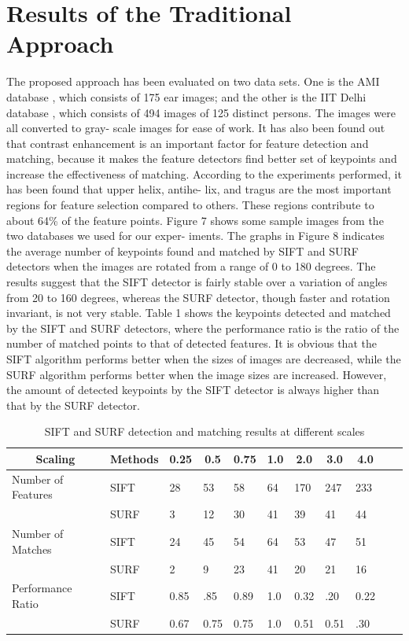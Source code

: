 \section{Results of the Traditional Approach}
The proposed approach has been evaluated on two data sets. One is the AMI database \cite{AMI}, which consists of 175 ear images; and the other is the IIT Delhi database \cite{IIT}, which consists of 494 images of 125 distinct persons. The images were all converted to gray- scale images for ease of work. It has also been found out that contrast enhancement is an important factor for feature detection and matching, because it makes the feature detectors find better set of keypoints and increase the effectiveness of matching.
According to the experiments performed, it has been found that upper helix, antihe- lix, and tragus are the most important regions for feature selection compared to others. These regions contribute to about 64{\%} of the feature points.
Figure 7 shows some sample images from the two databases we used for our exper- iments. The graphs in Figure 8 indicates the average number of keypoints found and matched by SIFT and SURF detectors when the images are rotated from a range of 0 to 180 degrees. The results suggest that the SIFT detector is fairly stable over a variation of angles from 20 to 160 degrees, whereas the SURF detector, though faster and rotation invariant, is not very stable.
Table 1 shows the keypoints detected and matched by the SIFT and SURF detectors, where the performance ratio is the ratio of the number of matched points to that of detected features. It is obvious that the SIFT algorithm performs better when the sizes of images are decreased, while the SURF algorithm performs better when the image sizes are increased. However, the amount of detected keypoints by the SIFT detector is always higher than that by the SURF detector.

\begin{table}[]
\centering
\caption{SIFT and SURF detection and matching results at different scales}
\label{table1}
\begin{tabular}{lllllllllll}
\hline
\multicolumn{1}{c}{Scaling} &           
\multicolumn{1}{c}{Methods} &          
\multicolumn{1}{c}{0.25} &     
\multicolumn{1}{c}{0.5} &     
\multicolumn{1}{c}{0.75} &     
\multicolumn{1}{c}{1.0} &     
\multicolumn{1}{c}{2.0} &     
\multicolumn{1}{c}{3.0} &     
\multicolumn{1}{c}{4.0} &       \\ \cline{1-2}
\hline
 Number of Features & SIFT  & 28  & 53  & 58 & 64 & 170  & 247  & 233   \\
 & SURF & 3  & 12  & 30 & 41 & 39 & 41 & 44   \\
 \hline
  Number of Matches & SIFT  & 24  & 45  & 54 & 64 & 53  & 47  & 51   \\
 & SURF & 2  & 9  & 23 & 41 & 20 & 21 & 16   \\
 \hline
 Performance Ratio & SIFT  & 0.85  & .85  & 0.89 & 1.0 & 0.32 & .20 & 0.22  \\
 & SURF & 0.67 & 0.75  & 0.75 & 1.0  &  0.51 & 0.51 & .30  \\
 \hline
\end{tabular}
\end{table}

